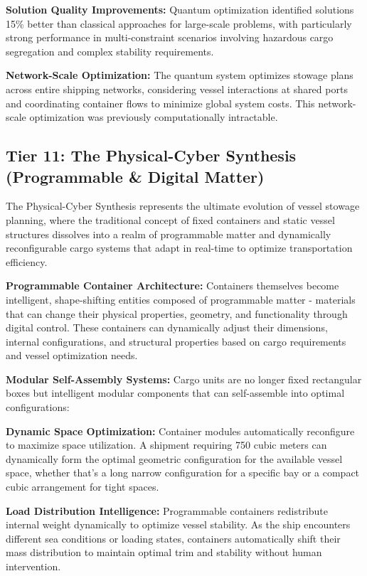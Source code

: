 \documentclass{article}
\begin{document}
\textbf{Solution Quality Improvements:} Quantum optimization identified solutions 15\% better than classical approaches for large-scale problems, with particularly strong performance in multi-constraint scenarios involving hazardous cargo segregation and complex stability requirements.

\textbf{Network-Scale Optimization:} The quantum system optimizes stowage plans across entire shipping networks, considering vessel interactions at shared ports and coordinating container flows to minimize global system costs. This network-scale optimization was previously computationally intractable.

\subsection{Tier 11: The Physical-Cyber Synthesis (Programmable \& Digital Matter)}

The Physical-Cyber Synthesis represents the ultimate evolution of vessel stowage planning, where the traditional concept of fixed containers and static vessel structures dissolves into a realm of programmable matter and dynamically reconfigurable cargo systems that adapt in real-time to optimize transportation efficiency.

\textbf{Programmable Container Architecture:}
Containers themselves become intelligent, shape-shifting entities composed of programmable matter - materials that can change their physical properties, geometry, and functionality through digital control. These containers can dynamically adjust their dimensions, internal configurations, and structural properties based on cargo requirements and vessel optimization needs.

\textbf{Modular Self-Assembly Systems:}
Cargo units are no longer fixed rectangular boxes but intelligent modular components that can self-assemble into optimal configurations:

\textbf{Dynamic Space Optimization:} Container modules automatically reconfigure to maximize space utilization. A shipment requiring 750 cubic meters can dynamically form the optimal geometric configuration for the available vessel space, whether that's a long narrow configuration for a specific bay or a compact cubic arrangement for tight spaces.

\textbf{Load Distribution Intelligence:} Programmable containers redistribute internal weight dynamically to optimize vessel stability. As the ship encounters different sea conditions or loading states, containers automatically shift their mass distribution to maintain optimal trim and stability without human intervention.
\end{document}
